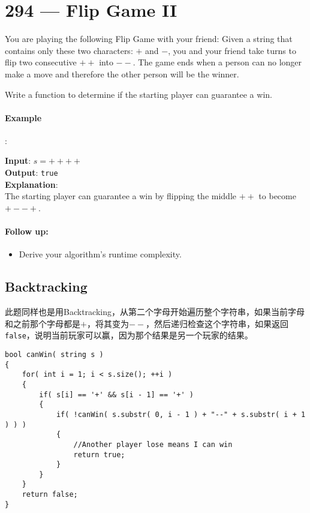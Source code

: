 \section{294 --- Flip Game II}
You are playing the following Flip Game with your friend: Given a string that contains only these two characters: $+$ and $-$, you and your friend take turns to flip two consecutive $++$ into $--$. The game ends when a person can no longer make a move and therefore the other person will be the winner.
\par
Write a function to determine if the starting player can guarantee a win.
\par
\paragraph{Example}:

\begin{flushleft}
\textbf{Input}: $s = ++++$
\\
\textbf{Output}: \texttt{true} 
\\
\textbf{Explanation}:
\\
The starting player can guarantee a win by flipping the middle $++$ to become $+--+$.
\end{flushleft}

\paragraph{Follow up:}
\begin{itemize}
\item Derive your algorithm's runtime complexity.
\end{itemize}
\subsection{Backtracking}
此题同样也是用Backtracking，从第二个字母开始遍历整个字符串，如果当前字母和之前那个字母都是$+$，将其变为$--$，然后递归检查这个字符串，如果返回\texttt{false}，说明当前玩家可以赢，因为那个结果是另一个玩家的结果。
\setcounter{lstlisting}{0}
\begin{lstlisting}[style=customc, caption={Backtracking}]
bool canWin( string s )
{
    for( int i = 1; i < s.size(); ++i )
    {
        if( s[i] == '+' && s[i - 1] == '+' )
        {
            if( !canWin( s.substr( 0, i - 1 ) + "--" + s.substr( i + 1 ) ) )
            {
                //Another player lose means I can win
                return true;
            }
        }
    }
    return false;
}

\end{lstlisting}


